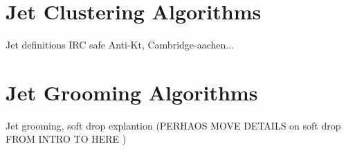 \section{Jet Clustering Algorithms}
\label{sec:ch4:clusering}

Jet definitions IRC safe
Anti-Kt, Cambridge-aachen...










\section{Jet Grooming Algorithms}
\label{sec:ch4:grooming}


Jet grooming, soft drop explantion (PERHAOS MOVE DETAILS on soft drop FROM INTRO TO HERE )